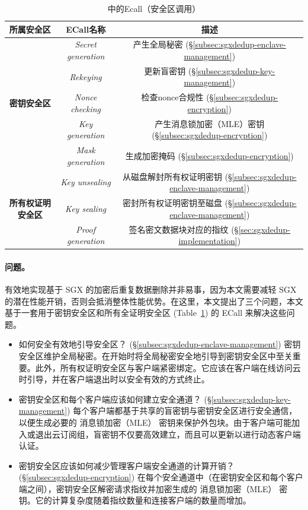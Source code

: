 \begin{table}[t]
\small
\centering
\begin{tabular}{ccc}
\toprule
{\bf 所属安全区} & {\bf ECall名称} & {\bf 描述}\\ 
\midrule
\multirow{5}{*}{\bf 密钥安全区}
& \textit{ Secret generation} & 产生全局秘密 
(\S\ref{subsec:sgxdedup-enclave-management}) \\
& \textit{ Rekeying} & 更新盲密钥 
(\S\ref{subsec:sgxdedup-key-management}) \\
& \textit{ Nonce checking} & 检查nonce合规性 
(\S\ref{subsec:sgxdedup-encryption}) \\
& \textit{ Key generation} & 产生消息锁加密（MLE）密钥 (\S\ref{subsec:sgxdedup-encryption}) \\
& \textit{ Mask generation} & 生成加密掩码 (\S\ref{subsec:sgxdedup-encryption}) \\
\hline
\multirow{3}{*}{\bf 所有权证明安全区}
& \textit{ Key unsealing} & 从磁盘解封所有权证明密钥 (\S\ref{subsec:sgxdedup-enclave-management}) \\
& \textit{ Key sealing} & 密封所有权证明密钥至磁盘 (\S\ref{subsec:sgxdedup-enclave-management}) \\
& \textit{ Proof generation} & 签名密文数据块对应的指纹 
(\S\ref{sec:sgxdedup-implementation}) \\
\bottomrule
\end{tabular}
\vspace{-6pt}
\caption{\sysnameS 中的Ecall（安全区调用）}
\label{tab:sgxdedup-ecall}
\vspace{-3pt}
\end{table}

\paragraph*{问题。} 有效地​​实现基于 SGX 的加密后重复数据删除并非易事，因为本文需要减轻 SGX 的潜在性能开销，否则会抵消整体性能优势。在这里，本文提出了三个问题，本文基于一套用于密钥安全区和所有全证明安全区 (Table~\ref{tab:sgxdedup-ecall}) 的 ECall 来解决这些问题。

\begin{itemize}[leftmargin=*]
\item 如何安全有效地引导安全区？ (\S\ref{subsec:sgxdedup-enclave-management})
  密钥安全区维护全局秘密。在开始时将全局秘密安全地引导到密钥安全区中至关重要。此外，所有权证明安全区与客户端紧密绑定。它应该在客户端在线访问云时引导，并在客户端退出时以安全有效的方式终止。
\item 密钥安全区和每个客户端应该如何建立安全通道？ (\S\ref{subsec:sgxdedup-key-management})
  每个客户端都基于共享的盲密钥与密钥安全区进行安全通信，以便生成必要的 消息锁加密（MLE） 密钥来保护外包块。由于客户端可能加入或退出云订阅组，盲密钥不仅要高效建立，而且可以更新以进行动态客户端认证。
\item 密钥安全区应该如何减少管理客户端安全通道的计算开销？ (\S\ref{subsec:sgxdedup-encryption})
  在每个安全通道中（在密钥安全区和每个客户端之间），密钥安全区解密请求指纹并加密生成的 消息锁加密（MLE） 密钥。它的计算复杂度随着指纹数量和连接客户端的数量而增加。
\end{itemize}
